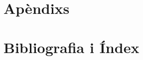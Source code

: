 \documentclass[catalan,a4paper,twoside,11pt]{book}
\begin{document}
   \part{Apèndixs}
      \appendix
      \renewcommand*{\chaptername}{\appendixname}
      
      
      
      
      
      
   \part{Bibliografia i Índex}
   \backmatter
      
      \printindex
 
\end{document}
